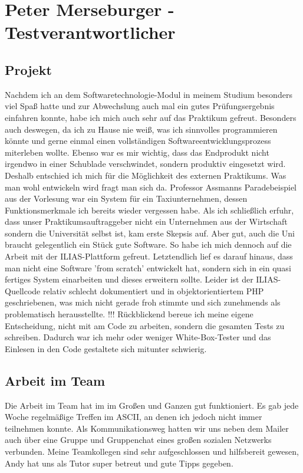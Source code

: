 \documentclass[a4paper]{scrreprt}
\begin{document}
\chapter{Peter Merseburger - Testverantwortlicher}

\section{Projekt}
Nachdem ich an dem Softwaretechnologie-Modul in meinem Studium besonders viel Spaß hatte und zur Abwechslung auch mal ein gutes Prüfungsergebnis einfahren konnte, habe ich mich auch sehr auf das Praktikum gefreut. Besonders auch deswegen, da ich zu Hause nie weiß, was ich sinnvolles programmieren könnte und gerne einmal einen vollständigen Softwareentwicklungsprozess miterleben wollte. Ebenso war es mir wichtig, dass das Endprodukt nicht irgendwo in einer Schublade verschwindet, sondern produktiv eingesetzt wird. Deshalb entschied ich mich für die Möglichkeit des externen Praktikums.
Was man wohl entwickeln wird fragt man sich da. Professor Assmanns Paradebeispiel aus der Vorlesung war ein System für ein Taxiunternehmen, dessen Funktionsmerkmale ich bereits wieder vergessen habe. Als ich schließlich erfuhr, dass unser Praktikumsauftraggeber nicht ein Unternehmen aus der Wirtschaft sondern die Universität selbst ist, kam erste Skepsis auf. Aber gut, auch die Uni braucht gelegentlich ein Stück gute Software. So habe ich mich dennoch auf die Arbeit mit der ILIAS-Plattform gefreut. Letztendlich lief es darauf hinaus, dass man nicht eine Software 'from scratch' entwickelt hat, sondern sich in ein quasi fertiges System einarbeiten und dieses erweitern sollte. Leider ist der ILIAS-Quellcode relativ schlecht dokumentiert und in objektorientiertem PHP geschriebenen, was mich nicht gerade froh stimmte und sich zunehmends als problematisch herausstellte.
!!!
Rückblickend bereue ich meine eigene Entscheidung, nicht mit am Code zu arbeiten, sondern die gesamten Tests zu schreiben. Dadurch war ich mehr oder weniger White-Box-Tester und das Einlesen in den Code gestaltete sich mitunter schwierig.
\section{Arbeit im Team}
Die Arbeit im Team hat im im Großen und Ganzen gut funktioniert. Es gab jede Woche regelmäßige Treffen im ASCII, an denen ich jedoch nicht immer teilnehmen konnte. Als Kommunikationsweg hatten wir uns neben dem Mailer auch über eine Gruppe und Gruppenchat eines großen sozialen Netzwerks verbunden. Meine Teamkollegen sind sehr aufgeschlossen und hilfsbereit gewesen, Andy hat uns als Tutor super betreut und gute Tipps gegeben.
\end{document}
